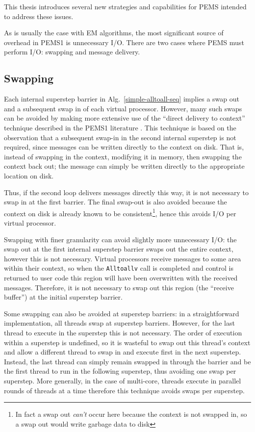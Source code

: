 \documentclass[12pt]{carletoncsthesis}
\begin{document}
This thesis introduces several new strategies and capabilities for PEMS
intended to address these issues.

As is usually the case with EM algorithms, the most significant source
of overhead in PEMS1 is unnecessary I/O.  There are two cases where PEMS
must perform I/O: swapping and message delivery.

\subsection{Swapping}
\label{improvements-swap}


Each internal superstep barrier in Alg.~\ref{simple-alltoall-seq} implies a
swap out and a subsequent swap in of each virtual processor.  However, many
such swaps can be avoided by making more extensive use of the ``direct delivery
to context'' technique described in the PEMS1 literature \cite{mnthesis}.
This technique is based on the observation that a subsequent swap-in in
the second internal superstep is not required, since messages can be written
directly to the context on disk.  That is, instead of swapping in the context,
modifying it in memory, then swapping the context back out; the message can
simply be written directly to the appropriate location on disk.

Thus, if the second loop delivers messages directly this way, it is not
necessary to swap in at the first barrier.  The final swap-out is also avoided
because the context on disk is already known to be consistent\footnote{In
fact a swap out {\em can't} occur here because the context is not swapped
in, so a swap out would write garbage data to disk}, hence this avoids
 I/O per virtual processor.

Swapping with finer granularity can avoid slightly more unnecessary I/O: the
swap out at the first internal superstep barrier swaps out the entire context,
however this is not necessary.  Virtual processors receive messages to some
area within their context, so when the {\tt Alltoallv} call is completed and
control is returned to user code this region will have been overwritten with
the received messages.  Therefore, it is not necessary to swap out this region
(the ``receive buffer'') at the initial superstep barrier.

Some swapping can also be avoided at superstep barriers: in a straightforward
implementation, all threads swap at superstep barriers.  However, for the
last thread to execute in the superstep this is not necessary.  The order
of execution within a superstep is undefined, so it is wasteful to swap out
this thread's context and allow a different thread to swap in and execute
first in the next superstep.  Instead, the last thread can simply remain
swapped in through the barrier and be the first thread to run in the following
superstep, thus avoiding one swap per superstep.  More generally, in the case
of multi-core, threads execute in parallel rounds of  threads at a time
therefore this technique avoids  swaps per superstep.
\end{document}
